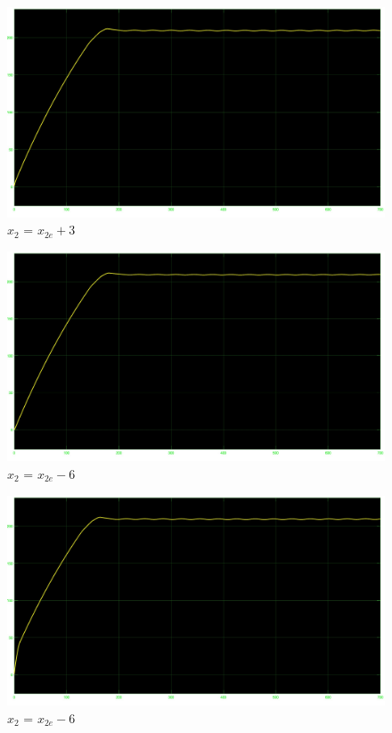 \documentclass[a4paper, 11pt]{article}
\begin{document}
\begin{figure}[!h]
    \centering
    \includegraphics[scale=0.2]{punto_2/x2+3.jpg}
    \caption{$x_2$ = $x_{2e} + 3$}
    \label{fig:enter-label}
\end{figure}

\begin{figure}[!h]
    \centering
    \includegraphics[scale=0.2]{punto_2/NonLin_x1e_x2e-6.jpg}
    \caption{$x_2$ = $x_{2e} - 6$}
    \label{fig:enter-label}
\end{figure}

\begin{figure}[!h]
    \centering
    \includegraphics[scale=0.2]{punto_2/x2e+6.jpg}
    \caption{$x_2$ = $x_{2e} - 6$}
    \label{fig:enter-label}
\end{figure}
\end{document}

